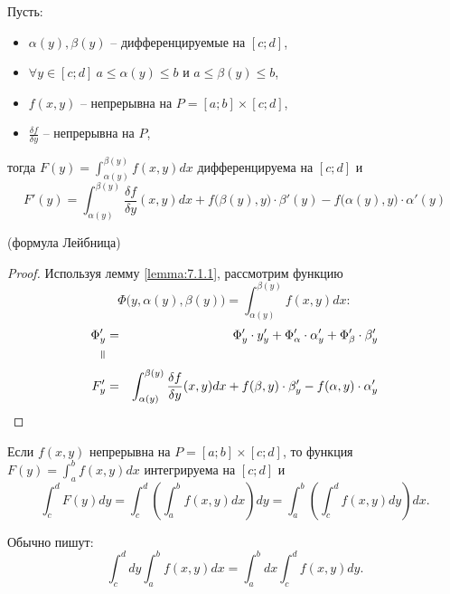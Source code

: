 \begin{theorem}\label{theorem:7.1.2}
    Пусть:
    \begin{itemize}
        \item $\alpha(y), \beta(y)$ -- дифференцируемые на $[c;d]$,
        \item $\forall y \in [c;d] \ a\leqslant \alpha(y) \leqslant b$ и $a \leqslant \beta(y) \leqslant b$,
        \item $f(x,y)$ -- непрерывна на $P = [a;b] \times [c;d]$,
        \item $\frac{\delta f}{\delta y}$ -- непрерывна на $P$,
    \end{itemize}
    тогда $F(y) = \int_{\alpha(y)}^{\beta(y)}f(x,y)dx$ дифференцируема на $[c;d]$ и
    \[
        F'(y) = \int_{\alpha(y)}^{\beta(y)}\frac{\delta f}{\delta y}(x,y)dx + f\big(\beta(y),y\big) \cdot \beta'(y) - f\big(\alpha(y),y\big)\cdot \alpha'(y)
    \]
    \begin{center}
        (формула Лейбница)
    \end{center}
\end{theorem}

\begin{proof}
    Используя лемму \ref{lemma:7.1.1}, рассмотрим функцию
    \[
        \Phi\big(y,\alpha(y),\beta(y)\big) = \int_{\alpha(y)}^{\beta(y)}f(x,y)dx:
    \]
    \begin{eqnarray*}
        \Phi_y' & = & \Phi_y' \cdot y_y' + \Phi_\alpha'\cdot\alpha_y' + \Phi_\beta' \cdot \beta_y'                                       \\
        \verteq &   &                                                                                                                    \\
        F_y'    & = & \int_{\alpha(y)}^{\beta(y)}\frac{\delta f}{\delta y}(x,y)dx + f(\beta,y)\cdot \beta_y' - f(\alpha,y)\cdot\alpha_y'
    \end{eqnarray*}
\end{proof}

\begin{theorem}\label{theorem:7.1.3}
    Если $ f(x,y) $ непрерывна на $ P = [a;b] \times [c;d] $, то функция $ F(y) = \int_{a}^{b}f(x,y)dx $ интегрируема на $ [c;d] $ и
    \[
        \int_{c}^{d}F(y)dy = \int_{c}^{d}\left(\int_{a}^{b}f(x,y)dx\right)dy = \int_{a}^{b}\left(\int_{c}^{d}f(x,y)dy\right)dx.
    \]

    Обычно пишут:
    \[
        \int_{c}^{d}dy \int_{a}^{b}f(x,y)dx = \int_{a}^{b}dx \int_{c}^{d}f(x,y)dy.
    \]
\end{theorem}

